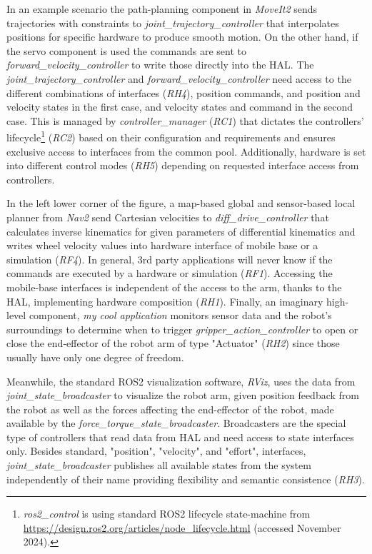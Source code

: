 \documentclass[journal]{IEEEtran}
\begin{document}
In an example scenario the path-planning component in \emph{MoveIt2} sends  trajectories with constraints to \emph{joint\_trajectory\_controller} that interpolates positions for specific hardware to produce smooth motion.
On the other hand, if the servo component is used the commands are sent to \emph{forward\_velocity\_controller} to write those directly into the HAL.
The \emph{joint\_trajectory\_controller} and \emph{forward\_velocity\_controller} need access to the different combinations of interfaces (\emph{RH4}), position commands, and position and velocity states in the first case, and velocity states and command in the second case.
This is managed by \emph{controller\_manager} (\emph{RC1}) that dictates the controllers' lifecycle\footnote{\emph{ros2\_control} is using standard ROS2 lifecycle state-machine from \url{https://design.ros2.org/articles/node\_lifecycle.html} (accessed November 2024).} (\emph{RC2}) based on their configuration and requirements and ensures exclusive access to interfaces from the common pool.
Additionally, hardware is set into different control modes (\emph{RH5}) depending on requested interface access from controllers.

In the left lower corner of the figure, a map-based global and sensor-based local planner from \emph{Nav2} send Cartesian velocities to \emph{diff\_drive\_controller} that calculates inverse kinematics for given parameters of differential kinematics and writes wheel velocity values into hardware interface of mobile base or a simulation (\emph{RF4}).
In general, 3rd party applications will never know if the commands are executed by a hardware or simulation (\emph{RF1}).
Accessing the mobile-base interfaces is independent of the access to the arm, thanks to the HAL, implementing hardware composition (\emph{RH1}).
Finally, an imaginary high-level component, \emph{my cool application} monitors sensor data and the robot's surroundings to determine when to trigger \emph{gripper\_action\_controller} to open or close the end-effector of the robot arm of type "Actuator" (\emph{RH2}) since those usually have only one degree of freedom.

Meanwhile, the standard ROS2 visualization software, \emph{RViz}, uses the data from \emph{joint\_state\_broadcaster} to visualize the robot arm, given position feedback from the robot as well as the forces affecting the end-effector of the robot, made available by the \emph{force\_torque\_state\_broadcaster}.
Broadcasters are the special type of controllers that read data from HAL and need access to state interfaces only.
Besides standard, "position", "velocity", and "effort", interfaces, \emph{joint\_state\_broadcaster} publishes all available states from the system independently of their name providing flexibility and semantic consistence (\emph{RH3}).
\end{document}
